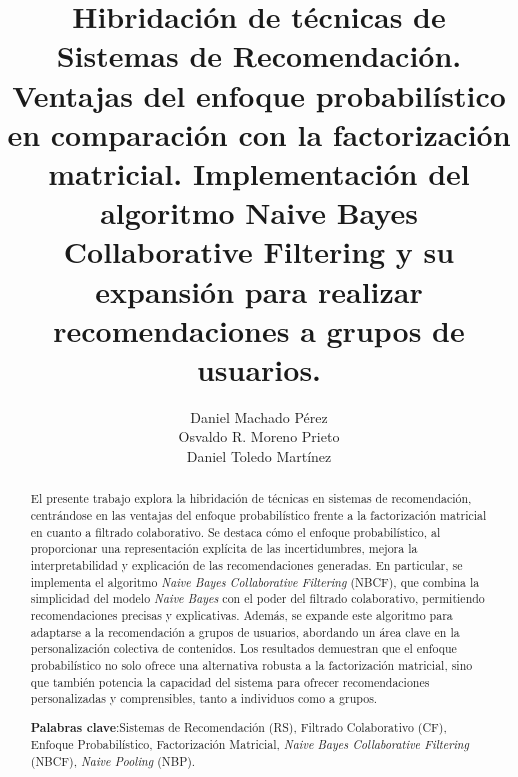 \documentclass[runningheads,a4paper]{llncs}
\newcommand{\keywords}[1]{\par\addvspace\baselineskip
\noindent\keywordname\enspace\ignorespaces#1}
\renewcommand{\keywordname}{\textbf{Palabras clave}:}
\begin{document}
\mainmatter  %

\title{Hibridación de técnicas de Sistemas de Recomendación. Ventajas del enfoque probabilístico en comparación con la factorización matricial. Implementación del algoritmo Naive Bayes Collaborative Filtering y su expansión para realizar recomendaciones a grupos de usuarios.}



\author{Daniel Machado Pérez\\
Osvaldo R. Moreno Prieto\\
Daniel Toledo Martínez}






\maketitle


\begin{abstract}
  El presente trabajo explora la hibridación de 
  técnicas en sistemas de recomendación, centrándose 
  en las ventajas del enfoque probabilístico frente a 
  la factorización matricial en cuanto a filtrado colaborativo. Se destaca cómo el 
  enfoque probabilístico, al proporcionar una 
  representación explícita de las incertidumbres, 
  mejora la interpretabilidad y explicación de las 
  recomendaciones generadas. En particular, 
  se implementa el algoritmo \textit{Naive Bayes Collaborative Filtering} (NBCF), 
  que combina la simplicidad del modelo \textit{Naive Bayes} 
  con el poder del filtrado colaborativo, 
  permitiendo recomendaciones precisas y explicativas. 
  Además, se expande este algoritmo para adaptarse 
  a la recomendación a grupos de usuarios, 
  abordando un área clave en la personalización 
  colectiva de contenidos. Los resultados demuestran 
  que el enfoque probabilístico no solo ofrece una 
  alternativa robusta a la factorización matricial, 
  sino que también potencia la capacidad del sistema 
  para ofrecer recomendaciones personalizadas y 
  comprensibles, tanto a individuos como a grupos.
\keywords{Sistemas de Recomendación (RS), Filtrado Colaborativo (CF), Enfoque Probabilístico, Factorización Matricial, \textit{Naive Bayes Collaborative Filtering} (NBCF), \textit{Naive Pooling} (NBP).}

\end{abstract}
\end{document}
